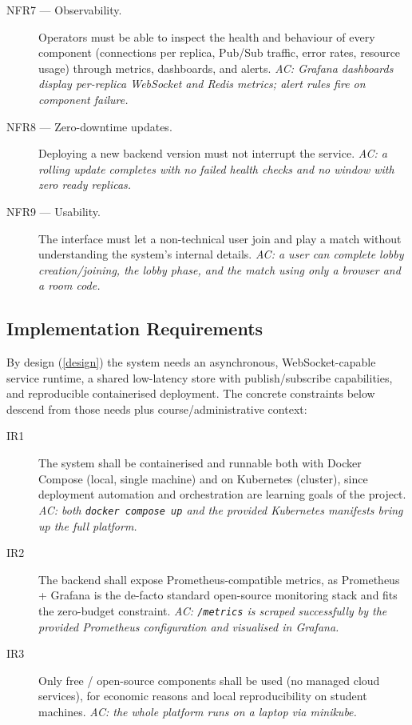 \documentclass{scrartcl}
\begin{document}
\begin{description}
      \item[NFR7 --- Observability.] Operators must be able to inspect the health
            and behaviour of every component (connections per replica, Pub/Sub traffic,
            error rates, resource usage) through metrics, dashboards, and alerts.
            \emph{AC: Grafana dashboards display per-replica WebSocket and Redis metrics;
                  alert rules fire on component failure.}

      \item[NFR8 --- Zero-downtime updates.] Deploying a new backend version must
            not interrupt the service. \emph{AC: a rolling update completes with no failed
                  health checks and no window with zero ready replicas.}

      \item[NFR9 --- Usability.] The interface must let a non-technical user join
            and play a match without understanding the system's internal details.
            \emph{AC: a user can complete lobby creation/joining, the lobby phase, and the
                  match using only a browser and a room code.}
\end{description}

\subsection{Implementation Requirements}\label{implementation-requirements}

By design (\cref{design}) the system needs an asynchronous, WebSocket-capable
service runtime, a shared low-latency store with publish/subscribe capabilities,
and reproducible containerised deployment. The concrete constraints below
descend from those needs plus course/administrative context:

\begin{description}
      \item[IR1] The system shall be containerised and runnable both with Docker
            Compose (local, single machine) and on Kubernetes (cluster), since deployment
            automation and orchestration are learning goals of the project. \emph{AC: both
                  \texttt{docker compose up} and the provided Kubernetes manifests bring up the
                  full platform.}

      \item[IR2] The backend shall expose Prometheus-compatible metrics, as
            Prometheus + Grafana is the de-facto standard open-source monitoring stack and
            fits the zero-budget constraint. \emph{AC: \texttt{/metrics} is scraped
                  successfully by the provided Prometheus configuration and visualised in
                  Grafana.}

      \item[IR3] Only free / open-source components shall be used (no managed cloud
            services), for economic reasons and local reproducibility on student machines.
            \emph{AC: the whole platform runs on a laptop via minikube.}
\end{description}
\end{document}
